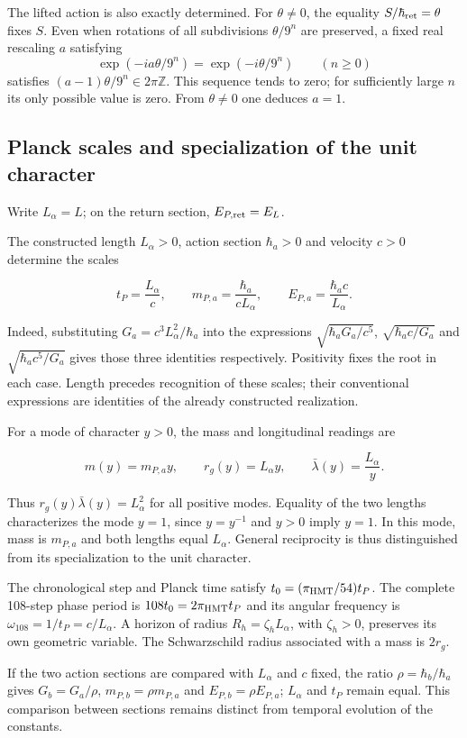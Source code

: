 The lifted action is also exactly determined. For \(\theta\ne0\), the equality \(S/\hbar_{\rm ret}=\theta\) fixes \(S\). Even when rotations of all subdivisions \(\theta/9^n\) are preserved, a fixed real rescaling \(a\) satisfying
\[
 \exp(-ia\theta/9^n)=\exp(-i\theta/9^n)
 \qquad(n\geq0)
\]
satisfies \((a-1)\theta/9^n\in2\pi\mathbb Z\). This sequence tends to zero; for sufficiently large \(n\) its only possible value is zero. From \(\theta\ne0\) one deduces \(a=1\).

\subsection{Planck scales and specialization of the unit character}

Write \(L_\alpha=L\); on the return section, \(E_{P,\rm ret}=E_L\).

The constructed length $L_\alpha>0$, action section $\hbar_a>0$ and velocity $c>0$ determine the scales

\[
t_P=\frac{L_\alpha}{c},\qquad
m_{P,a}=\frac{\hbar_a}{cL_\alpha},\qquad
E_{P,a}=\frac{\hbar_a c}{L_\alpha}.
\]

Indeed, substituting $G_a=c^3L_\alpha^2/\hbar_a$ into the expressions $\sqrt{\hbar_aG_a/c^5}$, $\sqrt{\hbar_ac/G_a}$ and $\sqrt{\hbar_ac^5/G_a}$ gives those three identities respectively. Positivity fixes the root in each case. Length precedes recognition of these scales; their conventional expressions are identities of the already constructed realization.

For a mode of character $y>0$, the mass and longitudinal readings are

\[
m(y)=m_{P,a}y,\qquad r_g(y)=L_\alpha y,\qquad
\bar\lambda(y)=\frac{L_\alpha}{y}.
\]

Thus $r_g(y)\bar\lambda(y)=L_\alpha^2$ for all positive modes. Equality of the two lengths characterizes the mode $y=1$, since $y=y^{-1}$ and $y>0$ imply $y=1$. In this mode, mass is $m_{P,a}$ and both lengths equal $L_\alpha$. General reciprocity is thus distinguished from its specialization to the unit character.

The chronological step and Planck time satisfy $t_0=(\pi_{\rm HMT}/54)t_P$. The complete 108-step phase period is $108t_0=2\pi_{\rm HMT}t_P$ and its angular frequency is $\omega_{108}=1/t_P=c/L_\alpha$. A horizon of radius $R_h=\zeta_hL_\alpha$, with $\zeta_h>0$, preserves its own geometric variable. The Schwarzschild radius associated with a mass is $2r_g$.

If the two action sections are compared with $L_\alpha$ and $c$ fixed, the ratio $\rho=\hbar_b/\hbar_a$ gives $G_b=G_a/\rho$, $m_{P,b}=\rho m_{P,a}$ and $E_{P,b}=\rho E_{P,a}$; $L_\alpha$ and $t_P$ remain equal. This comparison between sections remains distinct from temporal evolution of the constants.

